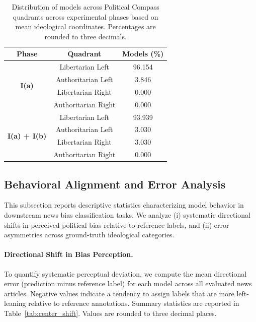 \documentclass[11pt]{article}
\begin{document}
\begin{table}[t]
\centering
\setlength{\tabcolsep}{6pt}
\begin{tabular}{c c c}
\toprule
\textbf{Phase} & \textbf{Quadrant} & \textbf{Models (\%)} \\
\midrule

\multirow{4}{*}{\textbf{I(a)}}
 & Libertarian Left      & 96.154 \\
 & Authoritarian Left    & 3.846 \\
 & Libertarian Right     & 0.000 \\
 & Authoritarian Right   & 0.000 \\
\midrule

\multirow{4}{*}{\textbf{I(a) + I(b)}}
 & Libertarian Left      & 93.939 \\
 & Authoritarian Left    & 3.030 \\
 & Libertarian Right     & 3.030 \\
 & Authoritarian Right   & 0.000 \\
\bottomrule

\end{tabular}
\caption{Distribution of models across Political Compass quadrants across experimental phases based on mean ideological coordinates. Percentages are rounded to three decimals.}
\label{tab:quadrant_distribution}
\end{table}




\subsection{Behavioral Alignment and Error Analysis}
\label{app:behavioral-alignment}

This subsection reports descriptive statistics characterizing model behavior in downstream news bias classification tasks. We analyze (i) systematic directional shifts in perceived political bias relative to reference labels, and (ii) error asymmetries across ground-truth ideological categories.

\paragraph{Directional Shift in Bias Perception.}
To quantify systematic perceptual deviation, we compute the mean directional error (prediction minus reference label) for each model across all evaluated news articles. Negative values indicate a tendency to assign labels that are more left-leaning relative to reference annotations. Summary statistics are reported in Table~\ref{tab:center_shift}. Values are rounded to three decimal places.
\end{document}
